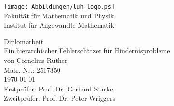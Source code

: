 \documentclass[a4paper,11pt,oneside]{book}
\theoremstyle{definition}
\theoremstyle{remark}
\newcommand{\<}{\langle}
\renewcommand{\>}{\rangle}
\renewcommand{\(}{\left(}
\renewcommand{\)}{\right)}
\newcommand{\nameofchapter}{}
\begin{document}
\frontmatter

\begin{titlepage} 

\begin{flushright}
 \texttt{[image: Abbildungen/luh\_logo.ps]}\\
 {\large Fakultät für Mathematik und Physik \\
Institut für Angewandte Mathematik} \\
\end{flushright}

\centering 

\vspace{2cm}

\Large
 Diplomarbeit\\[2cm]\huge 
Ein hierarchischer Fehlerschätzer für Hindernisprobleme\\[2.5cm]\Large 
von Cornelius Rüther \\
Matr.-Nr.: 2517350 \\[2.5cm]
\today \\  
\vfill
Erstprüfer: Prof. Dr. Gerhard Starke\\ %
Zweitprüfer: Prof. Dr. Peter Wriggers  
\end{titlepage} 

\setcounter{page}{2}



\tableofcontents

\listoffigures
{}

\listoftables
{}

\listofalgorithms
{}

\lstlistoflistings
{}


\mainmatter

\setcounter{page}{8}


\pagestyle{fancy}{
	\rhead{}
	\lhead{\sl\thechapter. \nameofchapter}
	\renewcommand{\headheight}{14pt}
	\renewcommand{\footrulewidth}{0.4pt}
	\cfoot{\thepage}
}
\end{document}
